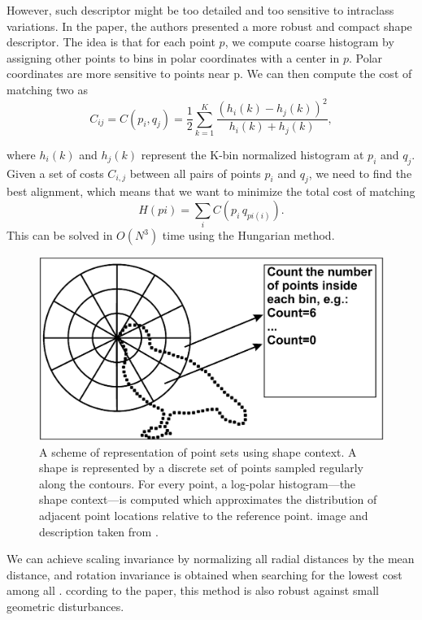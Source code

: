 However, such descriptor might be too detailed and too sensitive to intraclass variations. In the paper, the authors presented a more robust and compact shape descriptor. The idea is that for each point $p$, we compute coarse histogram by assigning other points to bins in polar coordinates with a center in $p$. Polar coordinates are more sensitive to points near p. We can then compute the cost of matching two  as 
\[ C_{ij} =  C(p_{i},q_{j}) = \frac{1}{2} \sum_{k=1}^{K} \frac{(h_{i}(k) - h_{j}(k))^2}{h_{i}(k) + h_{j}(k)}, \]

where $ h_{i}(k) $ and $ h_{j}(k) $ represent the K-bin normalized histogram at $p_{i}$ and $q_{j}$. Given a set of costs $C_{i,j}$ between all pairs of points $p_{i}$ and $q_{j}$, we need to find the best alignment, which means that we want to minimize the total cost of matching 
\[ H(pi) = \sum_{i} C(p_{i}\,q_{pi(i)}). \]
This can be solved in $O(N^3)$ time using the Hungarian method\cite{simple}. 

\begin{figure}
\centering
\includegraphics[width=\linewidth]{ext/polarbins.png}
\caption{A scheme of representation of point sets using shape context.
A shape is represented by a discrete set of points sampled regularly along
the contours. For every point, a log-polar histogram—the shape context—is
computed which approximates the distribution of adjacent point locations
relative to the reference point. image and description taken from \citet{simple}.}
\label{fig:polarbins}
\end{figure}

We can achieve scaling invariance by normalizing all radial distances by the mean distance, and rotation invariance is obtained when searching for the lowest cost  among all  . ccording to the paper, this method is also robust against small geometric disturbances.

